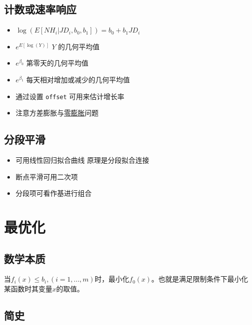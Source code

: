 \documentclass[
]{book}
\providecommand{\tightlist}{%
  \setlength{\itemsep}{0pt}\setlength{\parskip}{0pt}}
\begin{document}
\hypertarget{ux8ba1ux6570ux6216ux901fux7387ux54cdux5e94}{%
\section{计数或速率响应}\label{ux8ba1ux6570ux6216ux901fux7387ux54cdux5e94}}

\begin{itemize}
\tightlist
\item
  \(\log\left(E[NH_i | JD_i, b_0, b_1]\right) = b_0 + b_1 JD_i\)
\item
  \(e^{E[\log(Y)]}\) \(Y\) 的几何平均值
\item
  \(e^{\beta_0}\) 第零天的几何平均值
\item
  \(e^{\beta_1}\) 每天相对增加或减少的几何平均值
\item
  通过设置 \texttt{offset} 可用来估计增长率
\item
  注意方差膨胀与\href{http://cran.r-project.org/web/packages/pscl/index.html}{零膨胀}问题
\end{itemize}

\hypertarget{ux5206ux6bb5ux5e73ux6ed1}{%
\section{分段平滑}\label{ux5206ux6bb5ux5e73ux6ed1}}

\begin{itemize}
\tightlist
\item
  可用线性回归拟合曲线 原理是分段拟合连接
\item
  断点平滑可用二次项
\item
  分段项可看作基进行组合
\end{itemize}

\hypertarget{opt}{%
\chapter{最优化}\label{opt}}

\hypertarget{ux6570ux5b66ux672cux8d28}{%
\section{数学本质}\label{ux6570ux5b66ux672cux8d28}}

当\(f_i(x)\leq b_i,(i = 1,...,m)\)时，最小化\(f_0(x)\)。也就是满足限制条件下最小化某函数时其变量\(x\)的取值。

\hypertarget{ux7b80ux53f2}{%
\section{简史}\label{ux7b80ux53f2}}
\end{document}
